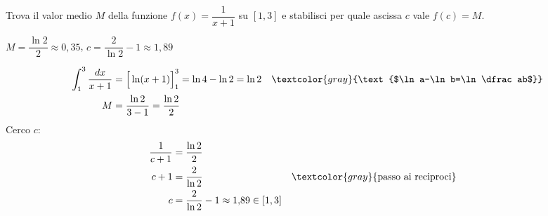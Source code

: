 \begin{question}[ID=3.5, subtitle={Valor medio di $1/(x+1)$ su $[1,3]$}, tags={integrali, valor medio}, difficulty=media]
Trova il valor medio $M$ della funzione $f(x) = \dfrac{1}{x + 1}$ su $[1, 3]$ e stabilisci per quale ascissa $c$ vale $f(c) = M$.
\begin{solution}
$M=\dfrac{\ln2}{2}\approx0{,}35$, \quad $c=\dfrac{2}{\ln2}-1\approx1{,}89$
\end{solution}
\begin{explanation}
\[\begin{aligned}
\int_1^3\dfrac{dx}{x+1} &= \Big[\ln(x+1)\Big]_1^3=\ln4-\ln2=\ln2 && \textcolor{gray}{\text{$\ln a-\ln b=\ln\dfrac ab$}}\\
M &= \dfrac{\ln2}{3-1}=\dfrac{\ln2}{2}
\end{aligned}\]
Cerco $c$:
\[\begin{aligned}
\dfrac{1}{c+1} &= \dfrac{\ln2}{2}\\
c+1 &= \dfrac{2}{\ln2} && \textcolor{gray}{\text{passo ai reciproci}}\\
c &= \dfrac{2}{\ln2}-1\approx1{,}89\in[1,3]
\end{aligned}\]
\end{explanation}
\end{question}


